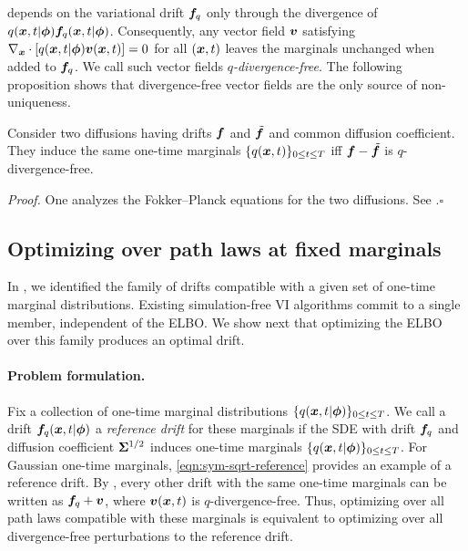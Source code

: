  depends on the variational drift $\boldsymbol{f}_q$ only through the divergence of $q(\boldsymbol{x}, t | \boldsymbol{\phi}) \boldsymbol{f}_q(\boldsymbol{x}, t | \boldsymbol{\phi})$. 
Consequently, any vector field $\boldsymbol{v}$ satisfying $\nabla_{\boldsymbol{x}} \cdot [q(\boldsymbol{x}, t | \boldsymbol{\phi}) \boldsymbol{v}(\boldsymbol{x}, t)] = 0$ for all  $(\boldsymbol{x}, t)$ leaves the marginals unchanged when added to $\boldsymbol{f}_q$. 
We call such vector fields \emph{$q$-divergence-free}. The following 
proposition shows that divergence-free vector fields are the only source of non-uniqueness.
\begin{proposition}\label{prop:div_free}
Consider two diffusions having drifts $\boldsymbol{f}$ and $\tilde{\boldsymbol{f}}$ and common diffusion coefficient. They induce the same one-time marginals $\{q(\boldsymbol{x}, t)\}_{0 \leq t \leq T}$ iff $\boldsymbol{f} - \tilde{\boldsymbol{f}}$ is $q$-divergence-free.   
\end{proposition}
\noindent\emph{Proof.}
One analyzes the Fokker--Planck equations for the two diffusions. See .\hfill$\square$

\subsection{Optimizing over path laws at fixed marginals}\label{subsec:helmholtz-decomp}
In , we identified the family of drifts compatible with a given set of one-time marginal distributions. 
Existing simulation-free VI algorithms commit to a single member, independent of the ELBO. 
We show next that optimizing the ELBO over this family produces an optimal drift.

\paragraph{Problem formulation.} 
Fix a collection of one-time marginal distributions $\{q(\boldsymbol{x}, t | \boldsymbol{\phi})\}_{0 \le t \le T}$. 
We call a drift $\boldsymbol{f}_q(\boldsymbol{x}, t | \boldsymbol{\phi})$ a \emph{reference drift} for these marginals if the SDE with drift $\boldsymbol{f}_q$ and diffusion coefficient $\boldsymbol{\Sigma}^{1/2}$ induces one-time marginals $\{q(\boldsymbol{x}, t | \boldsymbol{\phi})\}_{0 \leq t \leq T}$.
For Gaussian one-time marginals, \cref{eqn:sym-sqrt-reference} provides an example of a reference drift. 
By , every other drift with the same one-time marginals can be written as $\boldsymbol{f}_q + \boldsymbol{v}$, where $\boldsymbol{v}(\boldsymbol{x},t)$ is $q$-divergence-free. Thus, optimizing over all path laws compatible with these marginals is equivalent to optimizing over all divergence-free perturbations to the reference drift. 

